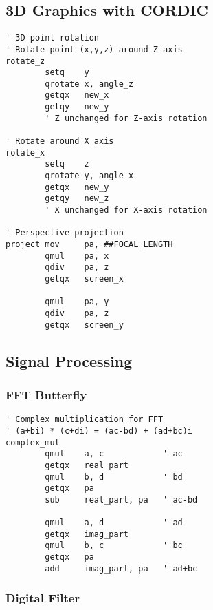 \documentclass[11pt]{book}
\begin{document}
\hypertarget{d-graphics-with-cordic}{%
\subsection{3D Graphics with CORDIC}\label{d-graphics-with-cordic}}

\begin{lstlisting}
' 3D point rotation
' Rotate point (x,y,z) around Z axis
rotate_z
        setq    y
        qrotate x, angle_z
        getqx   new_x
        getqy   new_y
        ' Z unchanged for Z-axis rotation
        
' Rotate around X axis
rotate_x
        setq    z
        qrotate y, angle_x
        getqx   new_y
        getqy   new_z
        ' X unchanged for X-axis rotation
        
' Perspective projection
project mov     pa, ##FOCAL_LENGTH
        qmul    pa, x
        qdiv    pa, z
        getqx   screen_x
        
        qmul    pa, y
        qdiv    pa, z
        getqx   screen_y
\end{lstlisting}

\hypertarget{signal-processing}{%
\subsection{Signal Processing}\label{signal-processing}}

\hypertarget{fft-butterfly}{%
\subsubsection{FFT Butterfly}\label{fft-butterfly}}

\begin{lstlisting}
' Complex multiplication for FFT
' (a+bi) * (c+di) = (ac-bd) + (ad+bc)i
complex_mul
        qmul    a, c            ' ac
        getqx   real_part
        qmul    b, d            ' bd
        getqx   pa
        sub     real_part, pa   ' ac-bd
        
        qmul    a, d            ' ad
        getqx   imag_part
        qmul    b, c            ' bc
        getqx   pa
        add     imag_part, pa   ' ad+bc
\end{lstlisting}

\hypertarget{digital-filter}{%
\subsubsection{Digital Filter}\label{digital-filter}}
\end{document}

